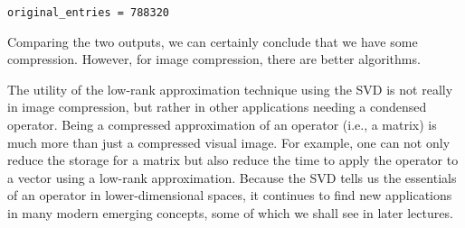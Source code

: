 \documentclass{ximera}
\begin{document}
\begin{problem}
\begin{problem}
\begin{verbatim}
original_entries = 788320
\end{verbatim}

Comparing the two outputs, we can certainly conclude that we have some compression. However, for image compression, there are better algorithms.

The utility of the low-rank approximation technique using the SVD is not really in image compression, but rather in other applications needing a condensed operator. Being a compressed approximation of an operator (i.e., a matrix) is much more than just a compressed visual image. For example, one can not only reduce the storage for a matrix but also reduce the time to apply the operator to a vector using a low-rank approximation. Because the SVD tells us the essentials of an operator in lower-dimensional spaces, it continues to find new applications in many modern emerging concepts, some of which we shall see in later lectures.
 

\end{problem}
\end{problem}
\end{document}

